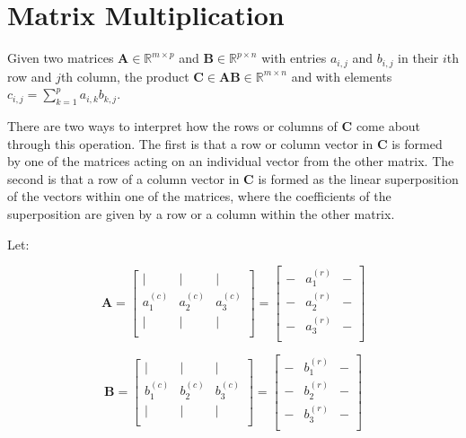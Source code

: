 \section{Matrix Multiplication}

Given two matrices $\mathbf{A}\in\mathbb{R}^{m \times p }$ and $\mathbf{B}\in\mathbb{R}^{p \times n}$ with entries $a_{i,j}$ and $b_{i,j}$ in their $i$th row and $j$th column, the product $\mathbf{C} \in \mathbf{AB}\in\mathbb{R}^{m \times n}$ and with elements $c_{i,j} = \sum_{k = 1}^{p} a_{i,k}b_{k,j}$.

There are two ways to interpret how the rows or columns of $\mathbf{C}$ come about through this operation. The first is that a row or column vector in $\mathbf{C}$ is formed by one of the matrices acting on an individual vector from the other matrix. The second is that a row of a column vector in $\mathbf{C}$ is formed as the linear superposition of the vectors within one of the matrices, where the coefficients of the superposition are given by a row or a column within the other matrix.

Let: 

\begin{equation}
\mathbf{A} = \left[
\begin{array}{ccc}
\vert & \vert & \vert \\
a^{(c)}_1 & a^{(c)}_2 & a^{(c)}_3\\
\vert & \vert & \vert \\
\end{array}
\right] =
\left[
\begin{array}{ccc}
- & a^{(r)}_1 & - \\
- & a^{(r)}_2 & - \\
- & a^{(r)}_3 & - \\
\end{array}
\right] 
\end{equation}

\begin{equation}
\mathbf{B} = \left[
\begin{array}{ccc}
\vert & \vert & \vert \\
b^{(c)}_1 & b^{(c)}_2 & b^{(c)}_3\\
\vert & \vert & \vert \\
\end{array}
\right] =
\left[
\begin{array}{ccc}
- & b^{(r)}_1 & - \\
- & b^{(r)}_2 & - \\
- & b^{(r)}_3 & - \\
\end{array}
\right] 
\end{equation}

